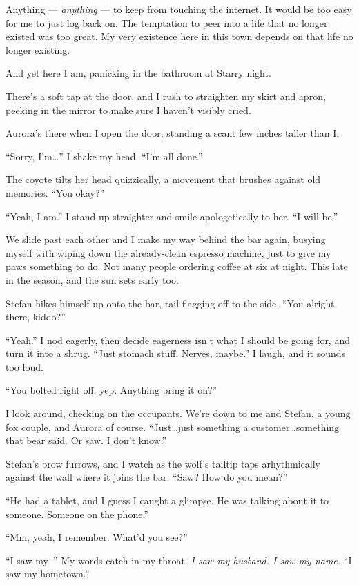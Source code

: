 Anything --- \emph{anything} --- to keep from touching the internet. It would be too easy for me to just log back on. The temptation to peer into a life that no longer existed was too great. My very existence here in this town depends on that life no longer existing.

And yet here I am, panicking in the bathroom at Starry night.

There's a soft tap at the door, and I rush to straighten my skirt and apron, peeking in the mirror to make sure I haven't visibly cried.

Aurora's there when I open the door, standing a scant few inches taller than I.

``Sorry, I'm\ldots{}'' I shake my head. ``I'm all done.''

The coyote tilts her head quizzically, a movement that brushes against old memories. ``You okay?''

``Yeah, I am.'' I stand up straighter and smile apologetically to her. ``I will be.''

We slide past each other and I make my way behind the bar again, busying myself with wiping down the already-clean espresso machine, just to give my paws something to do. Not many people ordering coffee at six at night. This late in the season, and the sun sets early too.

Stefan hikes himself up onto the bar, tail flagging off to the side. ``You alright there, kiddo?''

``Yeah.'' I nod eagerly, then decide eagerness isn't what I should be going for, and turn it into a shrug. ``Just stomach stuff. Nerves, maybe.'' I laugh, and it sounds too loud.

``You bolted right off, yep. Anything bring it on?''

I look around, checking on the occupants. We're down to me and Stefan, a young fox couple, and Aurora of course. ``Just\ldots{}just something a customer\ldots{}something that bear said. Or saw. I don't know.''

Stefan's brow furrows, and I watch as the wolf's tailtip taps arhythmically against the wall where it joins the bar. ``Saw? How do you mean?''

``He had a tablet, and I guess I caught a glimpse. He was talking about it to someone. Someone on the phone.''

``Mm, yeah, I remember. What'd you see?''

``I saw my--'' My words catch in my throat. \emph{I saw my husband. I saw my name.} ``I saw my hometown.''

